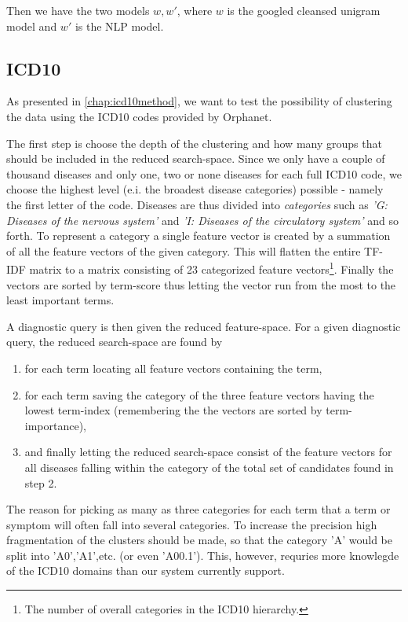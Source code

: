 \documentclass[10pt,letterpaper,final]{article}
\begin{document}
Then we have the two models $w, w'$, where $w$ is the googled cleansed
unigram model and $w'$ is the NLP model.



\subsection{ICD10}
As presented in \ref{chap:icd10method}, we want to test the possibility of clustering
the data using the ICD10 codes provided by Orphanet. 

The first step is choose the depth of the clustering and how many groups that should
be included in the reduced search-space. Since we only have a couple of thousand 
diseases and only one, two or none diseases for each full ICD10 code, we choose the
highest level (e.i. the broadest disease categories) possible - namely the first letter
of the code. Diseases are thus divided into \textit{categories} such as \textit{'G: Diseases of the nervous system'}
and \textit{'I: Diseases of the circulatory system'} and so forth. To represent a
category a single feature vector is created by a summation of all the feature vectors of 
the given category. This will flatten the entire TF-IDF matrix to a matrix consisting
of 23 categorized feature vectors\footnote{The number of overall categories in the ICD10 hierarchy.}. 
Finally the vectors are sorted by term-score thus letting the vector run from
the most to the least important terms.

A diagnostic query is then given the reduced feature-space. For a given diagnostic query,
the reduced search-space are found by
\begin{enumerate}
    \item for each term locating all feature vectors containing the term,
    \item for each term saving the category of the three feature vectors having the lowest term-index (remembering the the vectors are sorted by term-importance),
    \item and finally letting the reduced search-space consist of the feature vectors for all diseases falling within the category of the total set of candidates found in step 2.
\end{enumerate}
The reason for picking as many as three categories for each term that a term or symptom will often fall into several categories. To increase the precision high fragmentation of the clusters should be made, so that the category 'A' would be split into 'A0','A1',etc. (or even 'A00.1'). This, however, requries more knowlegde of the ICD10 domains than our system currently support. 
\end{document}
